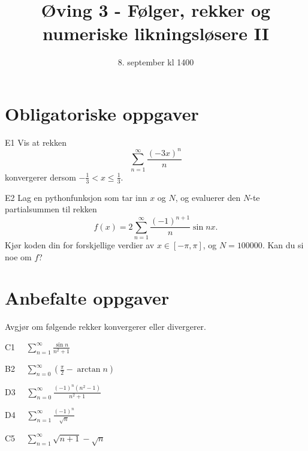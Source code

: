 \documentclass[a4paper,norsk,11pt]{interaktiv}
\title{Øving 3 - Følger, rekker og numeriske likningsløsere II}
\author{8. september kl 1400}
\begin{document}

\maketitle



\section*{Obligatoriske oppgaver}


\begin{oppgave}{E1}
Vis at rekken
\[
\sum_{n=1}^\infty \frac{(-3x)^n}{n}
\]
konvergerer dersom $-\frac{1}{3} < x \leq \frac{1}{3}$.
\end{oppgave}


\begin{oppgave}{E2}
Lag en pythonfunksjon som tar inn $x$ og $N$, 
og evaluerer den $N$-te partialsummen til rekken
\[
f(x)=2\sum_{n=1}^\infty \frac{(-1)^{n+1}}{n}\sin nx.
\]
Kjør koden din for forskjellige verdier av $x \in [-\pi,\pi]$, og $N=100000$. 
Kan du si noe om $f$?
\end{oppgave}




\section*{Anbefalte oppgaver}

  Avgjør om følgende rekker konvergerer eller divergerer.


\begin{oppgave}{C1}
    $\quad\displaystyle \sum_{n = 1}^\infty \frac{\sin n}{n^2 + 1}$
\end{oppgave}

\begin{oppgave}{B2}
    $\quad\displaystyle \sum_{n = 0}^\infty \left(\frac\pi2 - \arctan
      n\right)$
\end{oppgave}
\begin{oppgave}{D3}
    $\quad\displaystyle \sum_{n = 0}^\infty \frac{(-1)^n (n^2 - 1)}{n^2 +1}$
\end{oppgave}
\begin{oppgave}{D4}
    $\quad\displaystyle \sum_{n = 1}^\infty \frac{(-1)^n}{\sqrt n}$
\end{oppgave}
\begin{oppgave}{C5}
    $\quad\displaystyle \sum_{n=1}^{\infty} \sqrt{n+1}-\sqrt{n}$
\end{oppgave}
\end{document}
